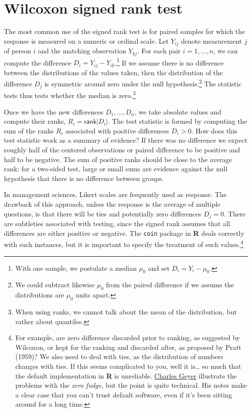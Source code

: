 \documentclass[
  11pt,
  letterpaper,
]{scrbook}
\theoremstyle{definition}
\theoremstyle{definition}
\theoremstyle{remark}
\begin{document}
\section{Wilcoxon signed rank test}\label{wilcoxon-signed-rank-test}

The most common use of the signed rank test is for paired samples for
which the response is measured on a numeric or ordinal scale. Let
\(Y_{ij}\) denote measurement \(j\) of person \(i\) and the matching
observation \(Y_{kj}\). For each pair \(i=1, \ldots, n\), we can compute
the difference \(D_i = Y_{ij}-Y_{ik}\).\footnote{With one sample, we
  postulate a median \(\mu_0\) and set \(D_i = Y_{i} - \mu_0\).} If we
assume there is no difference between the distributions of the values
taken, then the distribution of the difference \(D_j\) is symmetric
around zero under the null hypothesis.\footnote{We could subtract
  likewise \(\mu_0\) from the paired difference if we assume the
  distributions are \(\mu_0\) units apart.} The statistic tests thus
tests whether the median is zero.\footnote{When using ranks, we cannot
  talk about the mean of the distribution, but rather about quantiles.}

Once we have the new differences \(D_1, \ldots, D_n\), we take absolute
values and compute their ranks, \(R_i = \mathsf{rank}|D_i|\). The test
statistic is formed by computing the sum of the ranks \(R_i\) associated
with positive differences \(D_i>0\). How does this test statistic work
as a summary of evidence? If there was no difference we expect roughly
half of the centered observations or paired difference to be positive
and half to be negative. The sum of positive ranks should be close to
the average rank: for a two-sided test, large or small sums are evidence
against the null hypothesis that there is no difference between groups.

In management sciences, Likert scales are frequently used as response.
The drawback of this approach, unless the response is the average of
multiple questions, is that there will be ties and potentially zero
differences \(D_j=0\). There are subtleties associated with testing,
since the signed rank assumes that all differences are either positive
or negative. The \texttt{coin} package in \textbf{R} deals correctly
with such instances, but it is important to specify the treatment of
such values.\footnote{For example, are zero difference discarded prior
  to ranking, as suggested by Wilcoxon, or kept for the ranking and
  discarded after, as proposed by Pratt (1959)? We also need to deal
  with ties, as the distribution of numbers changes with ties. If this
  seems complicated to you, well it is\ldots{} so much that the default
  implementation in \textbf{R} is unreliable.
  \href{https://www.stat.umn.edu/geyer/5601/examp/signrank.html}{Charles
  Geyer} illustrate the problems with the \emph{zero fudge}, but the
  point is quite technical. His notes make a clear case that you can't
  trust default software, even if it's been sitting around for a long
  time.}
\end{document}

